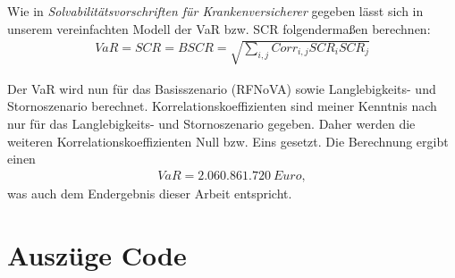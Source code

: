 \documentclass[parskip,12pt,paper=a4]{scrartcl}
\begin{document}
Wie in {\itshape Solvabilitätsvorschriften für Krankenversicherer} gegeben lässt sich in unserem vereinfachten Modell der VaR bzw. SCR folgendermaßen berechnen:
\begin{align*}
VaR = SCR = BSCR = \sqrt{\sum_{i,j} Corr_{i,j} SCR_i SCR_j}
\end{align*}

Der VaR wird nun für das Basisszenario (RFNoVA) sowie Langlebigkeits- und Stornoszenario berechnet. Korrelationskoeffizienten sind meiner Kenntnis nach nur für das Langlebigkeits- und Stornoszenario gegeben. Daher werden die weiteren Korrelationskoeffizienten Null bzw. Eins gesetzt. Die Berechnung ergibt einen 
\begin{align*}
VaR = 2.060.861.720 \  Euro,
\end{align*}
was auch dem Endergebnis dieser Arbeit entspricht.

\section{Auszüge Code}
\end{document}
